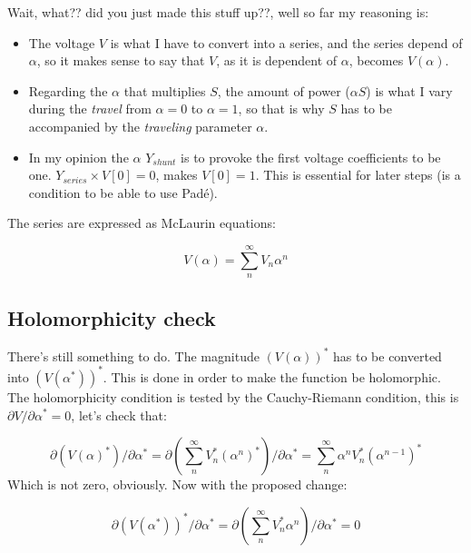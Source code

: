 \documentclass[nols,a4paper,twoside,symmetric,notoc,fleqn]{tufte-book}
\begin{document}
Wait, what?? did you just made this stuff up??, well so far my reasoning is:
\begin{itemize}
	\item The voltage ${V}$ is what I have to convert into a series, and the series depend of $\alpha$, so it makes sense to say that ${V}$, as it is dependent of $\alpha$, becomes ${V}(\alpha)$.
	
	\item Regarding the $\alpha$ that multiplies ${S}$, the amount of power ($\alpha {S}$) is what I vary during the \textit{travel} from $\alpha=0$ to $\alpha=1$, so that is why ${S}$ has to be accompanied by the \textit{traveling} parameter $\alpha.$
	
	\item In my opinion the $\alpha$ ${Y}_{shunt}$ is to provoke the first voltage coefficients to be one.  ${Y}_{series} \times {V}[0] = 0$, makes $V[0]=1$. This is essential for later steps (is a condition to be able to use Pad\'e). \newline
\end{itemize}

The series are expressed as McLaurin equations:

\begin{equation}
V(\alpha) = \sum_{n}^{\infty} V_n \alpha ^n
\label{eq:McLaurinV}
\end{equation}

\subsection{Holomorphicity check}
	
	There's still something to do. The magnitude $\left({V}( \alpha )\right)^*$ has to be converted into $\left({V}( \alpha^* )\right)^*$. This is done in order to make the function be holomorphic. The holomorphicity condition is tested by the Cauchy-Riemann condition, this is $\partial {V} / \partial \alpha^* = 0$, let's check that:
	
	\begin{equation}
	\partial \left({V}( \alpha )^*\right) / \partial \alpha^*  = \partial \left(\sum_{n}^{\infty} V_n^* (\alpha ^n)^*\right) / \partial \alpha^*  = \sum_{n}^{\infty} \alpha ^n V_n^* (\alpha ^{n-1})^*
	\end{equation} 
	Which is not zero, obviously. Now with the proposed change:
	
	\begin{equation}
	\partial \left( {V}( \alpha^* )\right)^* / \partial \alpha^*  = \partial \left(\sum_{n}^{\infty} {V}_n^* \alpha ^n \right) / \partial \alpha^*  = 0
	\end{equation} 
	
\end{document}
